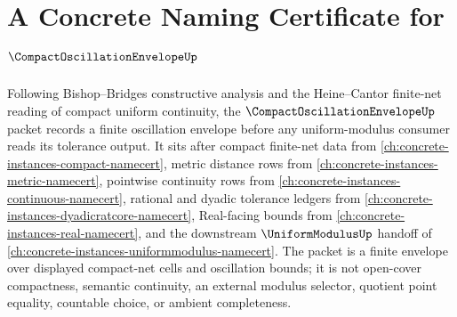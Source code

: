 \chapter{A Concrete Naming Certificate for $\CompactOscillationEnvelopeUp$}
\label{ch:concrete-instances-compact-oscillation-envelope-namecert}

Following Bishop--Bridges constructive analysis and the Heine--Cantor finite-net reading of compact uniform continuity, the $\CompactOscillationEnvelopeUp$ packet records a finite oscillation envelope before any uniform-modulus consumer reads its tolerance output. It sits after compact finite-net data from \autoref{ch:concrete-instances-compact-namecert}, metric distance rows from \autoref{ch:concrete-instances-metric-namecert}, pointwise continuity rows from \autoref{ch:concrete-instances-continuous-namecert}, rational and dyadic tolerance ledgers from \autoref{ch:concrete-instances-dyadicratcore-namecert}, Real-facing bounds from \autoref{ch:concrete-instances-real-namecert}, and the downstream $\UniformModulusUp$ handoff of \autoref{ch:concrete-instances-uniformmodulus-namecert}. The packet is a finite envelope over displayed compact-net cells and oscillation bounds; it is not open-cover compactness, semantic continuity, an external modulus selector, quotient point equality, countable choice, or ambient completeness.

